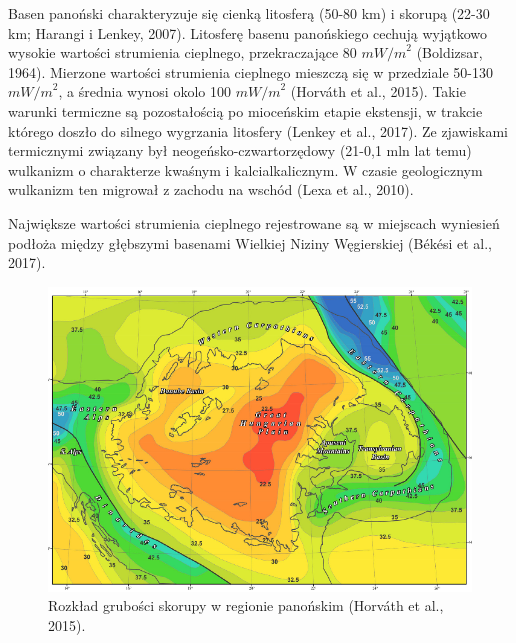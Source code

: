 \documentclass[11.5pt,twoside]{report}
\begin{document}

Basen panoński charakteryzuje się cienką litosferą (50-80 km) i skorupą (22-30 km; Harangi i Lenkey, 2007). Litosferę basenu panońskiego cechują wyjątkowo wysokie wartości strumienia cieplnego, przekraczające 80 ${mW/m}^{2}$ (Boldizsar, 1964). Mierzone wartości strumienia cieplnego mieszczą się w przedziale 50-130 ${mW/m}^{2}$, a średnia wynosi okolo 100 ${mW/m}^{2}$ (Horv\'{a}th et al., 2015). Takie warunki termiczne są pozostałością po mioceńskim etapie ekstensji, w trakcie którego doszło do silnego wygrzania litosfery (Lenkey et al., 2017). Ze zjawiskami termicznymi związany był neogeńsko-czwartorzędowy (21-0,1 mln lat temu) wulkanizm o charakterze kwaśnym i kalcialkalicznym. W czasie geologicznym wulkanizm ten migrował z zachodu na wschód (Lexa et al., 2010). 

Największe wartości strumienia cieplnego rejestrowane są w miejscach wyniesień podłoża między głębszymi basenami Wielkiej Niziny Węgierskiej (B\'{e}k\'{e}si et al., 2017). 

\begin{figure}[h]
	\centering
	\includegraphics[width=0.7\linewidth]{"../Termika/grubosc skorupy"}
	\caption{Rozkład grubości skorupy w regionie panońskim (Horváth et al., 2015).}
	\label{fig:grubosc-skorupy}
\end{figure}
\end{document}
